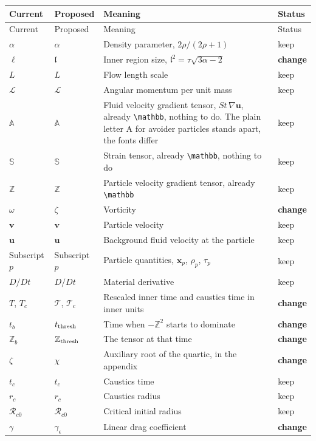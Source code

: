 \documentclass[11pt,a4paper]{article}
\newcommand{\mb}[1]{\mathbb{#1}}
\renewcommand{\vec}[1]{\boldsymbol{#1}}
\newcommand{\chg}{\textbf{change}}
\newcommand{\kp}{keep}
\begin{document}
\begin{longtable}{@{}p{3.1cm} p{3.1cm} p{8.6cm} p{1.6cm}@{}}
\toprule
Current & Proposed & Meaning & Status \\
\midrule
\endfirsthead
\toprule
Current & Proposed & Meaning & Status \\
\midrule
\endhead
$\alpha$ & $\alpha$ & Density parameter, $2\rho/(2\rho+1)$ & \kp \\
$\ell$ & $\mathfrak{l}$ & Inner region size, $\mathfrak{l}^2 = \tau\sqrt{3\alpha-2}$ & \chg \\
$L$ & $L$ & Flow length scale & \kp \\
$\mathscr{L}$ & $\mathscr{L}$ & Angular momentum per unit mass & \kp \\
$\mb{A}$ & $\mb{A}$ & Fluid velocity gradient tensor, $St\,\nabla\vec{u}$, already \verb|\mathbb|, nothing to do. The plain letter A for avoider particles stands apart, the fonts differ & \kp \\
$\mb{S}$ & $\mb{S}$ & Strain tensor, already \verb|\mathbb|, nothing to do & \kp \\
$\mb{Z}$ & $\mb{Z}$ & Particle velocity gradient tensor, already \verb|\mathbb| & \kp \\
$\omega$ & $\zeta$ & Vorticity & \chg \\
$\vec{v}$ & $\vec{v}$ & Particle velocity & \kp \\
$\vec{u}$ & $\vec{u}$ & Background fluid velocity at the particle & \kp \\
Subscript $p$ & Subscript $p$ & Particle quantities, $\vec{x}_p$, $\rho_p$, $\tau_p$ & \kp \\
$D/Dt$ & $D/Dt$ & Material derivative & \kp \\
$T$, $T_c$ & $\mathcal{T}$, $\mathcal{T}_c$ & Rescaled inner time and caustics time in inner units & \chg \\
$t_b$ & $t_{\rm thresh}$ & Time when $-\mb{Z}^2$ starts to dominate & \chg \\
$\mb{Z}_b$ & $\mb{Z}_{\rm thresh}$ & The tensor at that time & \chg \\
$\zeta$ & $\chi$ & Auxiliary root of the quartic, in the appendix & \chg \\
$t_c$ & $t_c$ & Caustics time & \kp \\
$r_c$ & $r_c$ & Caustics radius & \kp \\
$\mathcal{R}_{c0}$ & $\mathcal{R}_{c0}$ & Critical initial radius & \kp \\
$\gamma$ & $\gamma_\epsilon$ & Linear drag coefficient & \chg \\

\end{longtable}
\end{document}
